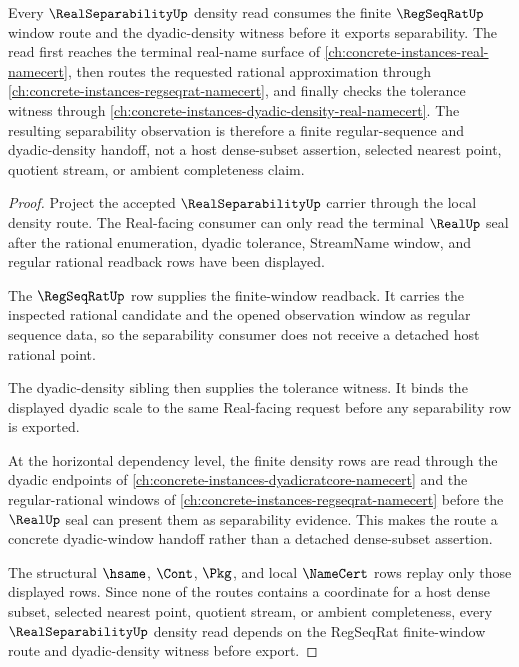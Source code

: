 \begin{theorem}
\label{thm:real-separability-regseqrat-dependency}
Every $\RealSeparabilityUp$ density read consumes the finite $\RegSeqRatUp$ window route and the dyadic-density witness before it exports separability. The read first reaches the terminal real-name surface of \autoref{ch:concrete-instances-real-namecert}, then routes the requested rational approximation through \autoref{ch:concrete-instances-regseqrat-namecert}, and finally checks the tolerance witness through \autoref{ch:concrete-instances-dyadic-density-real-namecert}. The resulting separability observation is therefore a finite regular-sequence and dyadic-density handoff, not a host dense-subset assertion, selected nearest point, quotient stream, or ambient completeness claim.
\end{theorem}
\begin{proof}
Project the accepted $\RealSeparabilityUp$ carrier through the local density route. The Real-facing consumer can only read the terminal $\RealUp$ seal after the rational enumeration, dyadic tolerance, StreamName window, and regular rational readback rows have been displayed.

The $\RegSeqRatUp$ row supplies the finite-window readback. It carries the inspected rational candidate and the opened observation window as regular sequence data, so the separability consumer does not receive a detached host rational point.

The dyadic-density sibling then supplies the tolerance witness. It binds the displayed dyadic scale to the same Real-facing request before any separability row is exported.

At the horizontal dependency level, the finite density rows are read through the dyadic endpoints of \autoref{ch:concrete-instances-dyadicratcore-namecert} and the regular-rational windows of \autoref{ch:concrete-instances-regseqrat-namecert} before the $\RealUp$ seal can present them as separability evidence. This makes the route a concrete dyadic-window handoff rather than a detached dense-subset assertion.

The structural $\hsame$, $\Cont$, $\Pkg$, and local $\NameCert$ rows replay only those displayed rows. Since none of the routes contains a coordinate for a host dense subset, selected nearest point, quotient stream, or ambient completeness, every $\RealSeparabilityUp$ density read depends on the RegSeqRat finite-window route and dyadic-density witness before export.
\end{proof}
